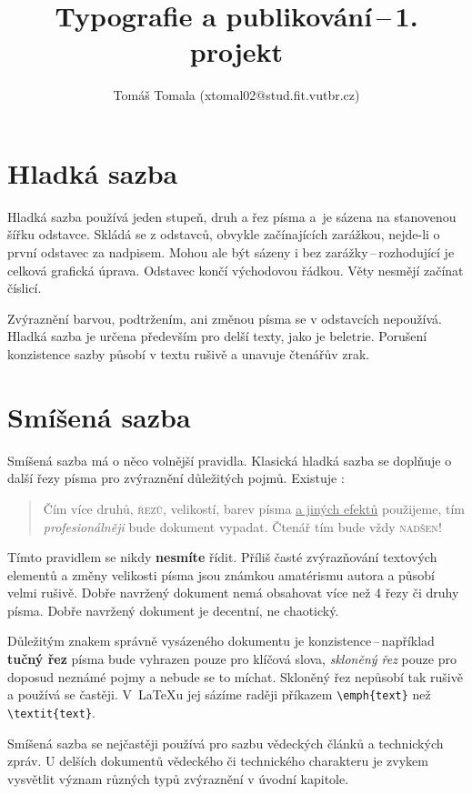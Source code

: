 \documentclass[a4paper, twocolumn, 10pt]{article}
\title{Typografie a publikování\,--\,1. projekt}
\author{Tomáš Tomala (xtomal02@stud.fit.vutbr.cz)}
\date{}
\begin{document}
\maketitle
\section{Hladká sazba}
Hladká sazba používá jeden stupeň, druh a řez písma a~je sázena na stanovenou šířku odstavce. Skládá se z odstavců, obvykle začínajících zarážkou, nejde-li o~ první odstavec za nadpisem. Mohou ale být sázeny i bez zarážky\,--\,rozhodující je celková grafická úprava. Odstavec končí východovou řádkou. Věty nesmějí začínat číslicí.

Zvýraznění barvou, podtržením, ani změnou písma se v odstavcích nepoužívá. Hladká sazba je určena především pro delší texty, jako je beletrie. Porušení konzistence sazby působí v textu rušivě a unavuje čtenářův zrak.
\section{Smíšená sazba}

Smíšená sazba má o něco volnější pravidla. Klasická hladká sazba se doplňuje o další řezy písma pro zvýraznění důležitých pojmů. Existuje :

\begin{quotation}
 \textsf{\large{Čím více druhů}}, \textsc{řezů}, {\tiny velikostí}, barev písma \underline{a jiných efektů} použijeme, tím \emph{\large profesionálněji} bude dokument vypadat. Čtenář tím bude vždy \textsc{nadšen}!
 \end{quotation}

{\small Tímto} pravidlem se nikdy \textbf{nesmíte} řídit. Příliš časté {\large zvýrazňování} textových elementů a změny velikosti {\huge písma} jsou známkou amatérismu autora a působí {\Huge velmi} rušivě. Dobře navržený dokument nemá obsahovat více než 4 řezy či druhy písma. Dobře navržený dokument je decentní, ne chaotický.

Důležitým znakem správně vysázeného dokumentu je konzistence\,--\,například \textbf{tučný řez} písma bude vyhrazen pouze pro klíčová slova, \emph{skloněný řez} pouze pro doposud neznámé pojmy a nebude se to míchat. Skloněný řez nepůsobí tak rušivě a používá se častěji. V~\LaTeX u jej sázíme raději příkazem \verb|\emph{text}| než \verb|\textit{text}|.

Smíšená sazba se nejčastěji používá pro sazbu vědeckých článků a technických zpráv. U delších dokumentů vědeckého či technického charakteru je zvykem vysvětlit význam různých typů zvýraznění v úvodní kapitole. 
\end{document}

